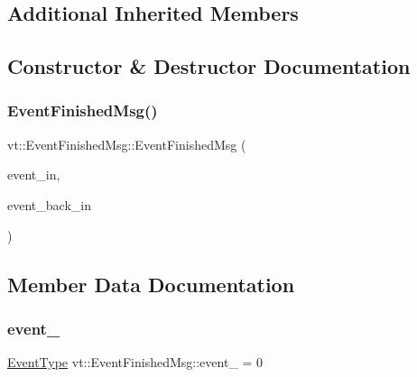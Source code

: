 \subsection*{Additional Inherited Members}


\subsection{Constructor \& Destructor Documentation}
\mbox{\label{structvt_1_1_event_finished_msg_a4f69462058e615d6465e27a14ec529b5}} 
\subsubsection{\texorpdfstring{Event\+Finished\+Msg()}{EventFinishedMsg()}}
{\footnotesize\ttfamily vt\+::\+Event\+Finished\+Msg\+::\+Event\+Finished\+Msg (\begin{DoxyParamCaption}\item[{\hyperlink{namespacevt_a009267401def7ae8bf201892222d060f}{Event\+Type} const \&}]{event\+\_\+in,  }\item[{\hyperlink{namespacevt_a009267401def7ae8bf201892222d060f}{Event\+Type} const \&}]{event\+\_\+back\+\_\+in }\end{DoxyParamCaption})\hspace{0.3cm}{\ttfamily [inline]}}



\subsection{Member Data Documentation}
\mbox{\label{structvt_1_1_event_finished_msg_a76503b9f78fb92679b810d0097ca85d5}} 
\subsubsection{\texorpdfstring{event\+\_\+}{event\_}}
{\footnotesize\ttfamily \hyperlink{namespacevt_a009267401def7ae8bf201892222d060f}{Event\+Type} vt\+::\+Event\+Finished\+Msg\+::event\+\_\+ = 0}

